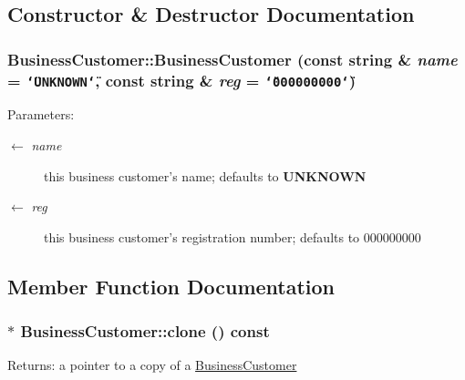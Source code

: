 \subsection{Constructor \& Destructor Documentation}
\hypertarget{classBusinessCustomer_c8a0dcdb32d7a866c7383824889bfbae}{
\subsubsection[BusinessCustomer]{\setlength{\rightskip}{0pt plus 5cm}BusinessCustomer::BusinessCustomer (const string \& {\em name} = {\tt \char`\"{}UNKNOWN\char`\"{}}, \/  const string \& {\em reg} = {\tt \char`\"{}000000000\char`\"{}})}}
\label{classBusinessCustomer_c8a0dcdb32d7a866c7383824889bfbae}


\begin{Desc}
\item[Parameters:]
\begin{description}
\item[\mbox{$\leftarrow$} {\em name}]this business customer's name; defaults to {\bf UNKNOWN} \item[\mbox{$\leftarrow$} {\em reg}]this business customer's registration number; defaults to 000000000 \end{description}
\end{Desc}


\subsection{Member Function Documentation}
\hypertarget{classBusinessCustomer_6aaf68c4c9f64ed6cbb24855664d7244}{
\subsubsection[clone]{ $\ast$ BusinessCustomer::clone () const}}
\label{classBusinessCustomer_6aaf68c4c9f64ed6cbb24855664d7244}


\begin{Desc}
\item[Returns:]a pointer to a copy of a \hyperlink{classBusinessCustomer}{BusinessCustomer} \end{Desc}


